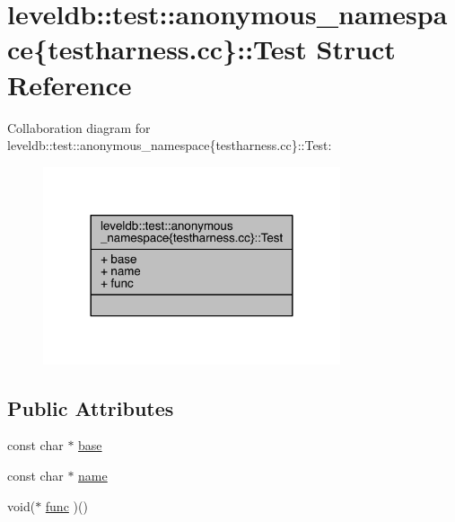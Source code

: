 \hypertarget{structleveldb_1_1test_1_1anonymous__namespace_02testharness_8cc_03_1_1_test}{}\section{leveldb\+:\+:test\+:\+:anonymous\+\_\+namespace\{testharness.\+cc\}\+:\+:Test Struct Reference}
\label{structleveldb_1_1test_1_1anonymous__namespace_02testharness_8cc_03_1_1_test}


Collaboration diagram for leveldb\+:\+:test\+:\+:anonymous\+\_\+namespace\{testharness.\+cc\}\+:\+:Test\+:
\nopagebreak
\begin{figure}[H]
\begin{center}
\leavevmode
\includegraphics[width=248pt]{structleveldb_1_1test_1_1anonymous__namespace_02testharness_8cc_03_1_1_test__coll__graph}
\end{center}
\end{figure}
\subsection*{Public Attributes}
\begin{DoxyCompactItemize}
\item 
const char $\ast$ \hyperlink{structleveldb_1_1test_1_1anonymous__namespace_02testharness_8cc_03_1_1_test_ab30b9ed1c26143e467216678b08c0721}{base}
\item 
const char $\ast$ \hyperlink{structleveldb_1_1test_1_1anonymous__namespace_02testharness_8cc_03_1_1_test_a1f65afaab3ef9024191b33938f2f5f4d}{name}
\item 
void($\ast$ \hyperlink{structleveldb_1_1test_1_1anonymous__namespace_02testharness_8cc_03_1_1_test_a16d5e150a69b357606a869d9076d6294}{func} )()
\end{DoxyCompactItemize}


